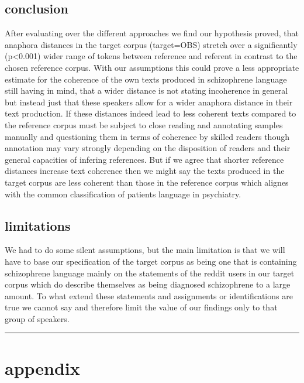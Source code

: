 \documentclass[
  12pt,
  oneside]{book}
\begin{document}
\section{conclusion}\label{conclusion}

After evaluating over the different approaches we find our hypothesis proved, that anaphora distances in the target corpus (target=OBS) stretch over a significantly (p\textless0.001) wider range of tokens between reference and referent in contrast to the chosen reference corpus. With our assumptions this could prove a less appropriate estimate for the coherence of the own texts produced in schizophrene language still having in mind, that a wider distance is not stating incoherence in general but instead just that these speakers allow for a wider anaphora distance in their text production. If these distances indeed lead to less coherent texts compared to the reference corpus must be subject to close reading and annotating samples manually and questioning them in terms of coherence by skilled readers though annotation may vary strongly depending on the disposition of readers and their general capacities of infering references. But if we agree that shorter reference distances increase text coherence then we might say the texts produced in the target corpus are less coherent than those in the reference corpus which alignes with the common classification of patients language in psychiatry.

\section{limitations}\label{limitations}

We had to do some silent assumptions, but the main limitation is that we will have to base our specification of the target corpus as being one that is containing schizophrene language mainly on the statements of the reddit users in our target corpus which do describe themselves as being diagnosed schizophrene to a large amount. To what extend these statements and assignments or identifications are true we cannot say and therefore limit the value of our findings only to that group of speakers.

\begin{center}\rule{0.5\linewidth}{0.5pt}\end{center}

\chapter{appendix}\label{appendix}
\end{document}
